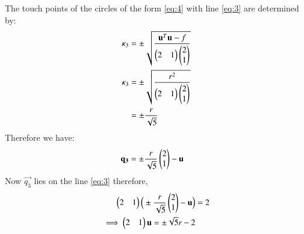 \documentclass[journal,12pt,twocolumn]{IEEEtran}
\begin{document}
The touch points of the circles of the form \eqref{eq:4}  with line \eqref{eq:3} are determined by:
\begin{align}
\kappa_{3} &= \pm \sqrt{\frac{\mathbf{u}^T\mathbf{u}-f}{\begin{pmatrix}2 & 1 \end{pmatrix}\begin{pmatrix}2 \\ 1 \end{pmatrix}}} \\
\kappa_{3} &= \pm \sqrt{\frac{r^2}{\begin{pmatrix}2 & 1 \end{pmatrix}\begin{pmatrix}2 \\ 1 \end{pmatrix}}} \\
& =  \pm \dfrac{r}{\sqrt{5}}
\end{align}
Therefore we have:
\begin{align}
\mathbf{q_{3}} &= \pm \dfrac{r}{\sqrt{5}}\begin{pmatrix}2 \\ 1\end{pmatrix} - \mathbf{u}
\end{align}
Now $\vec{q_{3}}$ lies on the line \eqref{eq:3} therefore,
\begin{align}
\begin{pmatrix}2 & 1\end{pmatrix}\Big(\pm \dfrac{r}{\sqrt{5}}\begin{pmatrix}2 \\ 1\end{pmatrix} - \mathbf{u}\Big) &= 2 \\
\implies \begin{pmatrix}2 & 1\end{pmatrix}\mathbf{u} = \pm\sqrt{5}r-2\label{eq:12}
\end{align}
\end{document}
